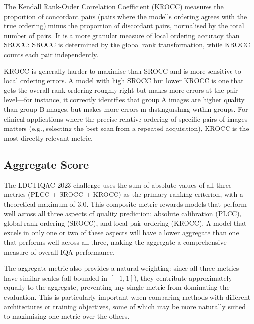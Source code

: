 The Kendall Rank-Order Correlation Coefficient (KROCC) measures the proportion of
concordant pairs (pairs where the model's ordering agrees with the true ordering) minus
the proportion of discordant pairs, normalised by the total number of pairs. It is a
more granular measure of local ordering accuracy than SROCC: SROCC is determined by
the global rank transformation, while KROCC counts each pair independently.

KROCC is generally harder to maximise than SROCC and is more sensitive to local ordering
errors. A model with high SROCC but lower KROCC is one that gets the overall rank
ordering roughly right but makes more errors at the pair level---for instance, it
correctly identifies that group A images are higher quality than group B images, but
makes more errors in distinguishing within groups. For clinical applications where the
precise relative ordering of specific pairs of images matters (e.g., selecting the
best scan from a repeated acquisition), KROCC is the most directly relevant metric.

\subsection{Aggregate Score}

The LDCTIQAC 2023 challenge uses the sum of absolute values of all three metrics
(PLCC + SROCC + KROCC) as the primary ranking criterion, with a theoretical maximum
of 3.0. This composite metric rewards models that perform well across all three
aspects of quality prediction: absolute calibration (PLCC), global rank ordering
(SROCC), and local pair ordering (KROCC). A model that excels in only one or two of
these aspects will have a lower aggregate than one that performs well across all three,
making the aggregate a comprehensive measure of overall IQA performance.

The aggregate metric also provides a natural weighting: since all three metrics have
similar scales (all bounded in $[-1, 1]$), they contribute approximately equally to the
aggregate, preventing any single metric from dominating the evaluation. This is
particularly important when comparing methods with different architectures or training
objectives, some of which may be more naturally suited to maximising one metric over
the others.
